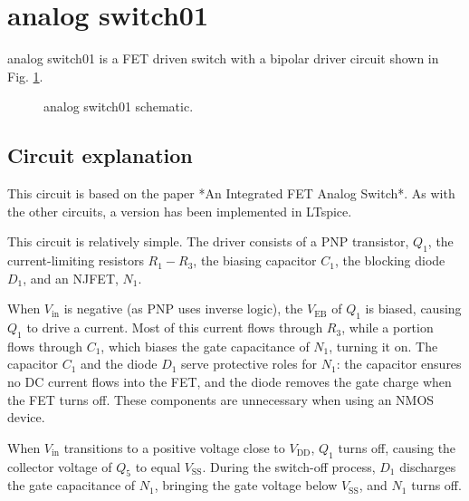 \documentclass[12pt]{article}
\begin{document}
\section{analog switch01}



analog switch01 is a FET driven switch with a bipolar driver circuit shown in Fig. \ref{analogswitch01}. 

\begin{figure}[H]
        \centering
        
        \caption{analog switch01 schematic.}
        \label{analogswitch01}
\end{figure}

\subsection{Circuit explanation}
This circuit is based on the paper *An Integrated FET Analog Switch*.  
As with the other circuits, a version has been implemented in LTspice.  

This circuit is relatively simple. The driver consists of a PNP transistor, $Q_1$, the current-limiting resistors $R_1 - R_3$, the biasing capacitor $C_1$, the blocking diode $D_1$, and an NJFET, $N_1$.  

When $V_{\text{in}}$ is negative (as PNP uses inverse logic), the $V_{\text{EB}}$ of $Q_1$ is biased, causing $Q_1$ to drive a current. Most of this current flows through $R_3$, while a portion flows through $C_1$, which biases the gate capacitance of $N_1$, turning it on. The capacitor $C_1$ and the diode $D_1$ serve protective roles for $N_1$: the capacitor ensures no DC current flows into the FET, and the diode removes the gate charge when the FET turns off. These components are unnecessary when using an NMOS device.  

When $V_{\text{in}}$ transitions to a positive voltage close to $V_{\text{DD}}$, $Q_1$ turns off, causing the collector voltage of $Q_5$ to equal $V_{\text{SS}}$. During the switch-off process, $D_1$ discharges the gate capacitance of $N_1$, bringing the gate voltage below $V_{\text{SS}}$, and $N_1$ turns off.  
\end{document}
